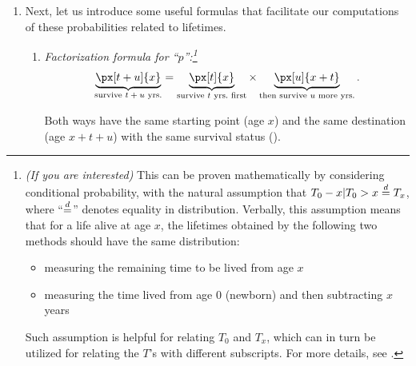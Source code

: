 \begin{enumerate}
\item Next, let us introduce some useful formulas that facilitate our
computations of these probabilities related to lifetimes.
\begin{enumerate}
\item\label{it:p-factorize} \emph{Factorization formula for
``\(p\)'':\footnote{\emph{(If you are interested)} This can be proven
mathematically by considering conditional probability, with the natural
assumption that \(T_0-x|T_0>x\overset{d}= T_x\), where ``\(\overset{d}=\)'' denotes equality in
distribution. Verbally, this assumption means that for a life alive at age
\(x\), the lifetimes obtained by the following two methods should have the same
distribution:
\begin{itemize}
\item measuring the remaining time to be lived from age \(x\)
\item measuring the time lived from age 0 (newborn) and then subtracting \(x\) years
\end{itemize}
Such assumption is helpful for relating \(T_0\) and \(T_x\), which can in turn
be utilized for relating the \(T\)'s with different subscripts. For
more details, see \textcite{dickson2019actuarial}.
}}
\[\underbrace{\px[t+u]{x}}_{\text{survive \(t+u\) yrs.}}=\underbrace{\px[t]{x}}_{\text{survive \(t\) yrs.\ first}}\times \underbrace{\px[u]{x+t}}_{\text{then survive \(u\) more yrs.}}.\]
\begin{center}
\end{center}
Both ways have the same starting point (age \(x\)) and the same destination
(age \(x+t+u\)) with the same survival status ().



\end{enumerate}
\end{enumerate}
